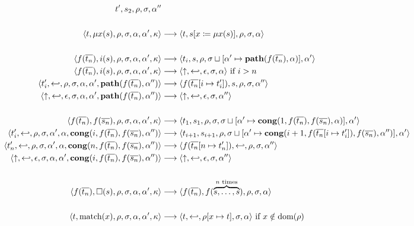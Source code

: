 \documentclass{article}
\begin{document}
{\begin{align*}
             {t',s_2,\rho,\sigma,\rest} \\
  \notag \\
  \transition{t,\fix{x}{s},\rho,\sigma,\old,\fresh,\kappa}{t,s[x \coloneqq \fix{x}{s}],\rho,\sigma,\old} \\
  \notag \\
  \transition{f(\overline{t_n}),\path{i}{s},\rho,\sigma,\old,\fresh,\kappa}
             {t_i,s,\rho,\sigma\update{\cont{path}{f(\overline{t_n}),\old}},\fresh} \\
  \transition{f(\overline{t_n}),\path{i}{s},\rho,\sigma,\old,\fresh,\kappa}
             {\fail,\return,\epsilon,\sigma,\old} \text{ if } i > n \\
  \transition{t_i',\return,\rho,\sigma,\old,\fresh,\cont{path}{f(\overline{t_n}),\rest}}
             {f(\overline{t_n}[i \mapsto t_i']),s,\rho,\sigma,\rest} \\
  \transition{\fail,\return,\epsilon,\sigma,\old,\fresh,\cont{path}{f(\overline{t_n}),\rest}}
             {\fail,\return,\epsilon,\sigma,\rest} \\
  \notag \\
  \transition{f(\overline{t_n}),f(\overline{s_n}),\rho,\sigma,\old,\fresh,\kappa}
             {t_1,s_1,\rho,\sigma,\sigma\update{\cont{cong}{1,f(\overline{t_n}),f(\overline{s_n}),\old}},\fresh} \\
  \transition{t_i',\return,\rho,\sigma,\fresh,\old,\cont{cong}{i,f(\overline{t_n}),f(\overline{s_n}),\rest}}
             {t_{i+1},s_{i+1},\rho,\sigma\update{\cont{cong}{i+1,f(\overline{t_n}[i \mapsto t_i']),f(\overline{s_n}),\rest}},\fresh} \\
  \transition{t_n',\return,\rho,\sigma,\fresh,\old,\cont{cong}{n,f(\overline{t_n}),f(\overline{s_n}),\rest}}
             {f(\overline{t_n}[n \mapsto t_n']),\return,\rho,\sigma,\rest} \\
  \transition{\fail,\return,\epsilon,\sigma,\old,\fresh,\cont{cong}{i,f(\overline{t_n}),f(\overline{s_n}),\rest}}
             {\fail,\return,\epsilon,\sigma,\rest} \\
  \notag \\
  \transition{f(\overline{t_n}),\all{s},\rho,\sigma,\old,\fresh,\kappa}
             {f(\overline{t_n}),f(\overbrace{s,\ldots,s}^{n \text{ times}}),\rho,\sigma,\old} \\
  \notag \\
  \transition{t,\match{x},\rho,\sigma,\old,\fresh,\kappa}
             {t,\return,\rho[x \mapsto t],\sigma,\old} \text{ if } x \notin \text{dom}(\rho) \\

\end{align*}}
\end{document}
